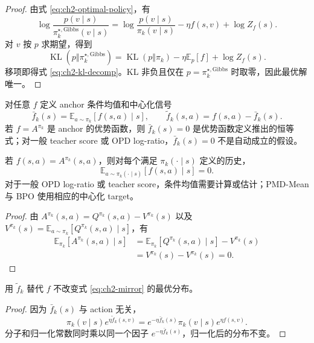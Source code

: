 \begin{proof}
由式 \eqref{eq:ch2-optimal-policy}，有
\[
\log\frac{p(v\mid s)}{\pi_k^{\star,\mathrm{Gibbs}}(v\mid s)}
=\log\frac{p(v\mid s)}{\pi_k(v\mid s)}-\eta f(s,v)+\log Z_f(s).
\]
对 $v$ 按 $p$ 求期望，得到
\[
\operatorname{KL}(p\Vert\pi_k^{\star,\mathrm{Gibbs}})
=\operatorname{KL}(p\Vert\pi_k)-\eta\mathbb E_p[f]+\log Z_f(s).
\]
移项即得式 \eqref{eq:ch2-kl-decomp}。KL 非负且仅在 $p=\pi_k^{\star,\mathrm{Gibbs}}$ 时取零，因此最优解唯一。
\end{proof}

\begin{definition}
\label{def:ch2-centered-signal}
对任意 $f$ 定义 anchor 条件均值和中心化信号
\[
\bar f_k(s)=\mathbb E_{a\sim\pi_k}[f(s,a)\mid s],
\qquad
\widetilde f_k(s,a)=f(s,a)-\bar f_k(s).
\]
若 $f=A^{\pi_k}$ 是 anchor 的优势函数，则 $\bar f_k(s)=0$ 是优势函数定义推出的恒等式；对一般 teacher score 或 OPD log-ratio，$\bar f_k(s)=0$ 不是自动成立的假设。
\end{definition}

\begin{proposition}
\label{prop:ch2-advantage-centering}
若 $f(s,a)=A^{\pi_k}(s,a)$，则对每个满足 $\pi_k(\cdot\mid s)$ 定义的历史，
\begin{equation}
\label{eq:ch2-advantage-zero-mean}
\mathbb E_{a\sim\pi_k(\cdot\mid s)}[f(s,a)\mid s]=0.
\end{equation}
对于一般 OPD log-ratio 或 teacher score，条件均值需要计算或估计；PMD-Mean 与 BPO 使用相应的中心化 target。
\end{proposition}

\begin{proof}
由 $A^{\pi_k}(s,a)=Q^{\pi_k}(s,a)-V^{\pi_k}(s)$ 以及
$V^{\pi_k}(s)=\mathbb E_{a\sim\pi_k}[Q^{\pi_k}(s,a)\mid s]$，有
\begin{align*}
\mathbb E_{\pi_k}[A^{\pi_k}(s,a)\mid s]
&=\mathbb E_{\pi_k}[Q^{\pi_k}(s,a)\mid s]-V^{\pi_k}(s)\\
&=V^{\pi_k}(s)-V^{\pi_k}(s)=0.
\end{align*}
\end{proof}

\begin{proposition}
\label{prop:ch2-centering}
用 $\widetilde f_k$ 替代 $f$ 不改变式 \eqref{eq:ch2-mirror} 的最优分布。
\end{proposition}

\begin{proof}
因为 $\bar f_k(s)$ 与 action 无关，
\[
\pi_k(v\mid s)e^{\eta\widetilde f_k(s,v)}
=e^{-\eta\bar f_k(s)}\pi_k(v\mid s)e^{\eta f(s,v)}.
\]
分子和归一化常数同时乘以同一个因子 $e^{-\eta\bar f_k(s)}$，归一化后的分布不变。
\end{proof}

